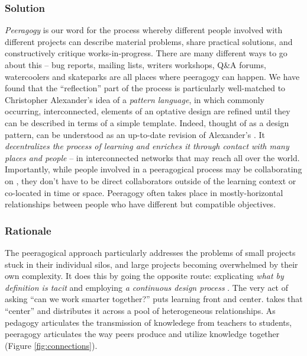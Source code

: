 \subsubsection*{Solution} \emph{Peeragogy} is our word for the process whereby different people involved with different projects can describe material problems, share practical solutions, and constructively critique works-in-progress.   There are many different ways to go about this -- bug reports, mailing lists, writers workshops, Q\&A forums, watercoolers and skateparks are all places where peeragogy can happen.  We have found that the ``reflection'' part of the process is particularly well-matched to Christopher Alexander's idea of a \emph{pattern language}, in which commonly occurring,  interconnected, elements of an optative design are refined until they can be described in terms of a simple template.  Indeed, thought of as a design pattern,  can be understood as an up-to-date revision of Alexander's  \cite[p. 99]{alexander1977pattern}.  It \emph{decentralizes the process of learning and enriches it through contact with many places and people} -- in interconnected networks that may reach all over the world.   Importantly, while people involved in a peeragogical process may be collaborating on , they don't have to be direct collaborators outside of the learning context or co-located in time or space.  Peeragogy often takes place in mostly-horizontal relationships between people who have different but compatible objectives.  

\subsubsection*{Rationale}
The peeragogical approach  particularly addresses the problems of small projects stuck in their individual silos, and large projects becoming overwhelmed by their own complexity.  It does this by going the opposite route: explicating \emph{what by definition is tacit} and employing \emph{a continuous design process} \cite[pp. 9--10]{schummer2014beyond}.  The very act of asking ``can we work smarter together?'' puts learning front and center.   takes that ``center'' and distributes it across a pool of heterogeneous relationships.  As pedagogy articulates the transmission of knowledege from teachers to students, peeragogy articulates the way peers produce and utilize knowledge together (Figure \ref{fig:connections}).

